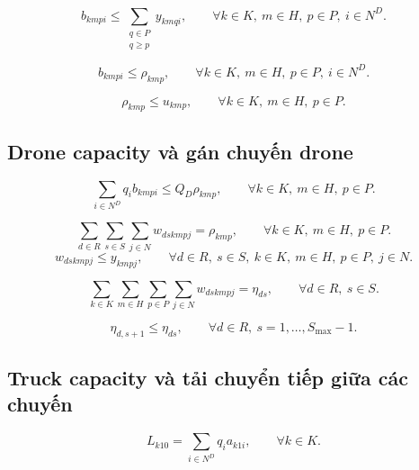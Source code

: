 \documentclass[12pt,a4paper]{article}
\begin{document}
\begin{equation}
  b_{kmpi}\le \sum_{\substack{q\in P\\q\ge p}} y_{kmqi},
  \qquad \forall k\in K,\ m\in H,\ p\in P,\ i\in N^D.
\end{equation}

\begin{equation}
  b_{kmpi}\le \rho_{kmp},
  \qquad \forall k\in K,\ m\in H,\ p\in P,\ i\in N^D.
\end{equation}

\begin{equation}
  \rho_{kmp}\le u_{kmp},
  \qquad \forall k\in K,\ m\in H,\ p\in P.
\end{equation}

\subsection{Drone capacity và gán chuyến drone}

\begin{equation}
  \sum_{i\in N^D}q_i b_{kmpi}\le Q_D\rho_{kmp},
  \qquad \forall k\in K,\ m\in H,\ p\in P.
\end{equation}

\begin{equation}
  \sum_{d\in R}\sum_{s\in S}\sum_{j\in N} w_{dskmpj}
  =
  \rho_{kmp},
  \qquad \forall k\in K,\ m\in H,\ p\in P.
\end{equation}
\begin{equation}
  w_{dskmpj}\le y_{kmpj},
  \qquad \forall d\in R,\ s\in S,\ k\in K,\ m\in H,\ p\in P,\ j\in N.
\end{equation}

\begin{equation}
  \sum_{k\in K}\sum_{m\in H}\sum_{p\in P}\sum_{j\in N}w_{dskmpj}
  =\eta_{ds},
  \qquad \forall d\in R,\ s\in S.
\end{equation}

\begin{equation}
  \eta_{d,s+1}\le \eta_{ds},
  \qquad \forall d\in R,\ s=1,\ldots,S_{\max}-1.
\end{equation}

\subsection{Truck capacity và tải chuyển tiếp giữa các chuyến}

\begin{equation}
  L_{k10}=\sum_{i\in N^D}q_i a_{k1i},
  \qquad \forall k\in K.
\end{equation}
\end{document}

